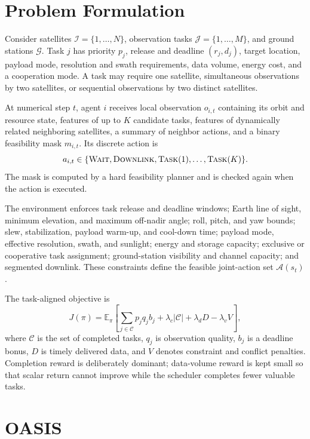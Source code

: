 \documentclass[letterpaper]{article}
\begin{document}
\section{Problem Formulation}

Consider satellites $\mathcal{I}=\{1,\ldots,N\}$, observation tasks $\mathcal{J}=\{1,\ldots,M\}$, and ground stations $\mathcal{G}$.  Task $j$ has priority $p_j$, release and deadline $(r_j,d_j)$, target location, payload mode, resolution and swath requirements, data volume, energy cost, and a cooperation mode.  A task may require one satellite, simultaneous observations by two satellites, or sequential observations by two distinct satellites.

At numerical step $t$, agent $i$ receives local observation $o_{i,t}$ containing its orbit and resource state, features of up to $K$ candidate tasks, features of dynamically related neighboring satellites, a summary of neighbor actions, and a binary feasibility mask $m_{i,t}$.  Its discrete action is
\begin{equation}
 a_{i,t}\in\{\textsc{Wait},\textsc{Downlink},\textsc{Task}(1),\ldots,\textsc{Task}(K)\}.
\end{equation}
The mask is computed by a hard feasibility planner and is checked again when the action is executed.

The environment enforces task release and deadline windows; Earth line of sight, minimum elevation, and maximum off-nadir angle; roll, pitch, and yaw bounds; slew, stabilization, payload warm-up, and cool-down time; payload mode, effective resolution, swath, and sunlight; energy and storage capacity; exclusive or cooperative task assignment; ground-station visibility and channel capacity; and segmented downlink.  These constraints define the feasible joint-action set $\mathcal{A}(s_t)$.

The task-aligned objective is
\begin{equation}
 J(\pi)=\mathbb{E}_{\pi}\!\left[
 \sum_{j\in\mathcal{C}} p_j q_j b_j
 + \lambda_c |\mathcal{C}|
 + \lambda_d D
 - \lambda_v V
 \right],
\end{equation}
where $\mathcal{C}$ is the set of completed tasks, $q_j$ is observation quality, $b_j$ is a deadline bonus, $D$ is timely delivered data, and $V$ denotes constraint and conflict penalties.  Completion reward is deliberately dominant; data-volume reward is kept small so that scalar return cannot improve while the scheduler completes fewer valuable tasks.

\section{OASIS}
\end{document}
